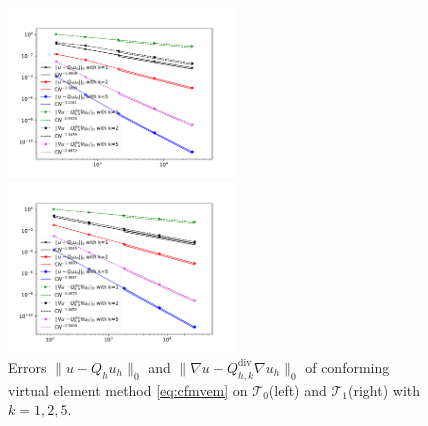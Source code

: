 \documentclass[10pt]{amsart}
\renewcommand{\div}{\operatorname{div}}
\numberwithin{equation}{section}
\begin{document}
\begin{figure}[htbp]
\centering
\begin{minipage}[t]{0.49\linewidth}
\centering
\includegraphics[width=6cm]{./figures/cvem_convex.pdf}
\end{minipage}%
\begin{minipage}[t]{0.49\linewidth}
\centering
\includegraphics[width=6cm]{./figures/cvem_nonconvex.pdf}
\end{minipage}%
\centering
\caption{Errors $\|u - Q_h u_h\|_0$ and $\|\nabla u - Q_{h, k}^{\div}\nabla u_h\|_0$ 
of conforming virtual element method \eqref{eq:cfmvem} on $\mathcal T_0$(left) and 
$\mathcal T_1$(right) with $k=1, 2, 5$.}
\label{fig:rate2}
\end{figure}





\end{document}
